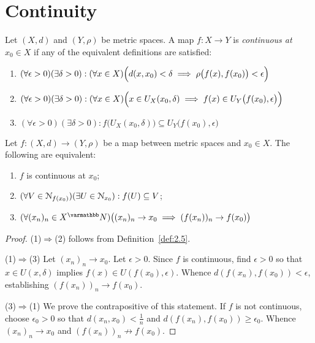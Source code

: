 \section{Continuity}\label{sec:continuity}
    \begin{definition}\label{def:2.5}
        Let $(X,d)$ and $(Y,\rho)$ be metric spaces. A map $f:X \rightarrow Y$ is \textit{continuous at $x_0 \in X$} if any of the equivalent definitions are satisfied:
            \begin{enumerate}[label = (\arabic*),itemsep=1pt,topsep=3pt]
                \item $(\forall \epsilon > 0)(\exists \delta > 0):(\forall x \in X)\Bigl(d(x,x_0) < \delta \implies \rho\bigl(f(x),f(x_0)\bigr) < \epsilon\Bigr)$
                \item $(\forall \epsilon > 0)(\exists \delta > 0):(\forall x \in X)\Bigl(x \in U_X(x_0, \delta) \implies f(x) \in U_Y\bigl(f(x_0),\epsilon\bigr)\Bigr)$
                \item $(\forall \epsilon > 0)(\exists \delta > 0):f\bigl(U_X(x_0,\delta)\bigr) \subseteq U_Y\bigl(f(x_0),\epsilon\bigr)$
            \end{enumerate}
    \end{definition}

    \begin{proposition}
        Let $f:(X,d) \rightarrow (Y,\rho)$ be a map between metric spaces and $x_0 \in X$. The following are equivalent:
            \begin{enumerate}[label = (\arabic*),itemsep=1pt,topsep=3pt]
                \item $f$ is continuous at $x_0$;
                \item $(\forall V \in \mathcal{N}_{f(x_0)})(\exists U \in \mathcal{N}_{x_0}):f(U) \subseteq V$;
                \item $(\forall (x_n)_n \in X^\bfN)\bigl((x_n)_n \rightarrow x_0 \implies (f(x_n))_n \rightarrow f(x_0)\bigr)$
            \end{enumerate}
    \end{proposition}
        \begin{proof}
            (1)$\Rightarrow$(2) follows from Definition~\ref{def:2.5}. 
            
            (1)$\Rightarrow$(3) Let $(x_n)_n \rightarrow x_0$. Let $\epsilon > 0$. Since $f$ is continuous, find $\epsilon > 0$ so that $x \in U(x,\delta)$ implies $f(x) \in U(f(x_0),\epsilon)$. Whence $d(f(x_n),f(x_0)) < \epsilon$, establishing $(f(x_n))_n \rightarrow f(x_0)$.

            (3)$\Rightarrow$(1) We prove the contrapositive of this statement. If $f$ is not continuous, choose $\epsilon_0>0$ so that $d(x_n,x_0) < \frac{1}{n}$ and $d(f(x_n),f(x_0)) \geq \epsilon_0$. Whence $(x_n)_n \rightarrow x_0$ and $(f(x_n))_n \not\rightarrow f(x_0)$.
        \end{proof}

